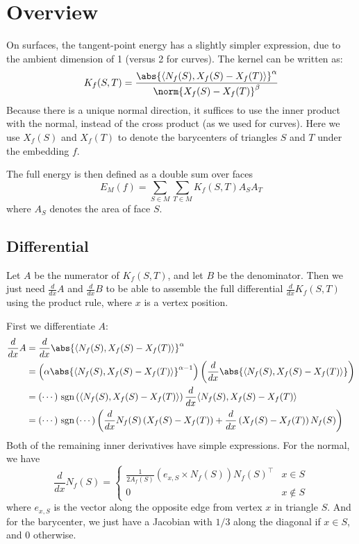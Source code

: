 \documentclass[11pt]{article}
\DeclarePairedDelimiter{\inner}{\langle}{\rangle}
\newcommand{\ddx}{\frac{d}{dx}}
\newcommand{\sgn}[1]{\ \textrm{sgn}\left(#1\right)}
\begin{document}

\thispagestyle{empty}

\section{Overview}

On surfaces, the tangent-point energy has a slightly simpler expression, due to the ambient dimension of 1 (versus 2 for curves). The kernel can be written as:
\begin{equation}
K_f(S, T) = \frac{\abs{\inner{N_f(S), X_f(S) - X_f(T)}}^{\alpha}}{\norm{X_f(S) - X_f(T)}^{\beta}}
\end{equation}
Because there is a unique normal direction, it suffices to use the inner product with the normal, instead of the cross product (as we used for curves). Here we use $X_f(S)$ and $X_f(T)$ to denote the barycenters of triangles $S$ and $T$ under the embedding $f$.

The full energy is then defined as a double sum over faces $$E_M(f) = \sum_{S \in M} \sum_{T \in M} K_f(S, T) A_S A_T$$ where $A_S$ denotes the area of face $S$.

\subsection{Differential}

Let $A$ be the numerator of $K_f(S, T)$, and let $B$ be the denominator. Then we just need $\ddx A$ and $\ddx B$ to be able to assemble the full differential $\ddx K_f(S, T)$ using the product rule, where $x$ is a vertex position.

First we differentiate $A$:
\begin{align*}
\ddx A &= \ddx \abs{\inner{N_f(S), X_f(S) - X_f(T)}}^{\alpha}\\
&= \left(\alpha \abs{\inner{N_f(S), X_f(S) - X_f(T)}}^{\alpha - 1}\right) \left(\ddx \abs{\inner{N_f(S), X_f(S) - X_f(T)}}\right)\\
&= (\cdots) \sgn{\inner{N_f(S), X_f(S) - X_f(T)}} \ddx \inner{N_f(S), X_f(S) - X_f(T)}\\
&= (\cdots) \sgn{\cdots} \left(\ddx N_f(S) \left(X_f(S) - X_f(T)\right) + \ddx \left(X_f(S) - X_f(T)\right) N_f(S)\right)
\end{align*}
Both of the remaining inner derivatives have simple expressions. For the normal, we have
$$\ddx N_f(S) = \left\{
\begin{array}{lr}
\frac{1}{2 A_f(S)} (e_{x,S} \times N_f(S)) N_f(S)^{\top} & x \in S \\
0 & x \not\in S
\end{array}\right.$$
where $e_{x,S}$ is the vector along the opposite edge from vertex $x$ in triangle $S$. And for the barycenter, we just have a Jacobian with $1/3$ along the diagonal if $x \in S$, and 0 otherwise.
\end{document}
